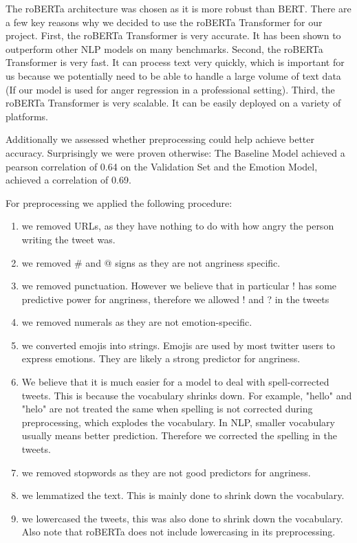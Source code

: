 \documentclass{article}
\begin{document}
The roBERTa architecture was chosen as it is more robust than BERT. There are a few key reasons why we decided to use the roBERTa Transformer for our project. First, the roBERTa Transformer is very accurate. It has been shown to outperform other NLP models on many benchmarks. Second, the roBERTa Transformer is very fast. It can process text very quickly, which is important for us because we potentially need to be able to handle a large volume of text data (If our model is used for anger regression in a professional setting). Third, the roBERTa Transformer is very scalable. It can be easily deployed on a variety of platforms. 

Additionally we assessed whether preprocessing could help achieve better accuracy. Surprisingly we were proven otherwise: The Baseline Model achieved a pearson correlation of 0.64 on the Validation Set and the Emotion Model, achieved a correlation of 0.69. 

For preprocessing we applied the following procedure:
\begin{enumerate}
    \item we removed URLs, as they have nothing to do with how angry the person writing the tweet was.
    \item we removed \# and @ signs as they are not angriness specific.
    \item we removed punctuation. However we believe that in particular ! has some predictive power for angriness, therefore we allowed ! and ? in the tweets
    \item we removed numerals as they are not emotion-specific.
    \item we converted emojis into strings. Emojis are used by most twitter users to express emotions. They are likely a strong predictor for angriness.
    \item We believe that it is much easier for a model to deal with spell-corrected tweets. This is because the vocabulary shrinks down. For example, "hello" and "helo" are not treated the same when spelling is not corrected during preprocessing, which explodes the vocabulary. In NLP, smaller vocabulary usually means better prediction. Therefore we corrected the spelling in the tweets.
    \item we removed stopwords as they are not good predictors for angriness.
    \item we lemmatized the text. This is mainly done to shrink down the vocabulary.
    \item we lowercased the tweets, this was also done to shrink down the vocabulary. Also note that roBERTa does not include lowercasing in its preprocessing.
\end{enumerate}
\end{document}
